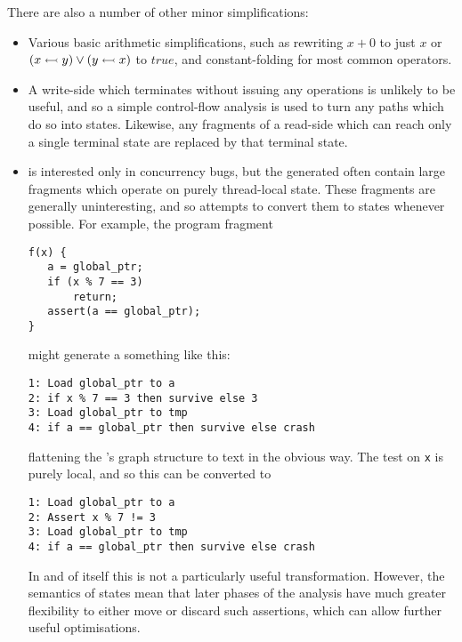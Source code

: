 There are also a number of other minor simplifications:

\begin{itemize}
\item
  Various basic arithmetic simplifications, such as rewriting $x + 0$
  to just $x$ or $(x \leftarrowtail y) \vee (y \leftarrowtail x)$ to
  $true$, and constant-folding for most common operators.
\item
  A write-side {\StateMachine} which terminates without issuing any
   operations is unlikely to be useful, and so a simple
  control-flow analysis is used to turn any paths which do so into
   states.  Likewise, any fragments of a read-side
        {\StateMachine} which can reach only a single terminal state
        are replaced by that terminal state.
\item
  {\Technique} is interested only in concurrency bugs, but the
  {\StateMachines} generated often contain large fragments which
  operate on purely thread-local state.  These fragments are generally
  uninteresting, and so {\technique} attempts to convert them to
   states whenever possible.  For example, the program
  fragment

\begin{verbatim}
f(x) {
   a = global_ptr;
   if (x % 7 == 3)
       return;
   assert(a == global_ptr);
}
\end{verbatim}

   might generate a {\StateMachine} something like this:

\begin{verbatim}
1: Load global_ptr to a
2: if x % 7 == 3 then survive else 3
3: Load global_ptr to tmp
4: if a == global_ptr then survive else crash
\end{verbatim}

   flattening the {\StateMachine}'s graph structure to text in the
   obvious way.  The test on \verb|x| is purely local, and so this
   {\StateMachine} can be converted to

\begin{verbatim}
1: Load global_ptr to a
2: Assert x % 7 != 3
3: Load global_ptr to tmp
4: if a == global_ptr then survive else crash
\end{verbatim}

   In and of itself this is not a particularly useful transformation.
   However, the semantics of  states mean that later
   phases of the analysis have much greater flexibility to either move
   or discard such assertions, which can allow further useful
   optimisations.  
\end{itemize}

